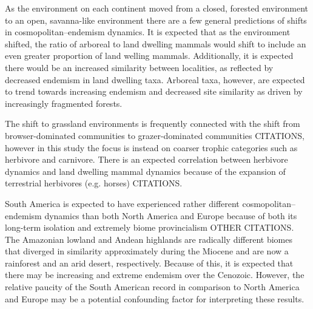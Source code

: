 \documentclass[12pt,letterpaper]{article}
\begin{document}
As the environment on each continent moved from a closed, forested environment to an open, savanna-like environment there are a few general predictions of shifts in cosmopolitan--endemism dynamics. It is expected that as the environment shifted, the ratio of arboreal to land dwelling mammals would shift to include an even greater proportion of land welling mammals. Additionally, it is expected there would be an increased similarity between localities, as reflected by decreased endemism in land dwelling taxa. Arboreal taxa, however, are expected to trend towards increasing endemism and decreased site similarity as driven by increasingly fragmented forests.

The shift to grassland environments is frequently connected with the shift from browser-dominated communities to grazer-dominated communities CITATIONS, however in this study the focus is instead on coarser trophic categories such as herbivore and carnivore. There is an expected correlation between herbivore dynamics and land dwelling mammal dynamics because of the expansion of terrestrial herbivores (e.g. horses) CITATIONS.

South America is expected to have experienced rather different cosmopolitan--endemism dynamics than both North America and Europe because of both its long-term isolation and extremely biome provincialism \citep{Flynn1998a,Macfadden2006} OTHER CITATIONS. The Amazonian lowland and Andean highlands are radically different biomes that diverged in similarity approximately during the Miocene \citep{Pascual1990,Ortiz-Jaureguizar2006} and are now a rainforest and an arid desert, respectively. Because of this, it is expected that there may be increasing and extreme endemism over the Cenozoic. However, the relative paucity of the South American record in comparison to North America and Europe may be a potential confounding factor for interpreting these results.
\end{document}
